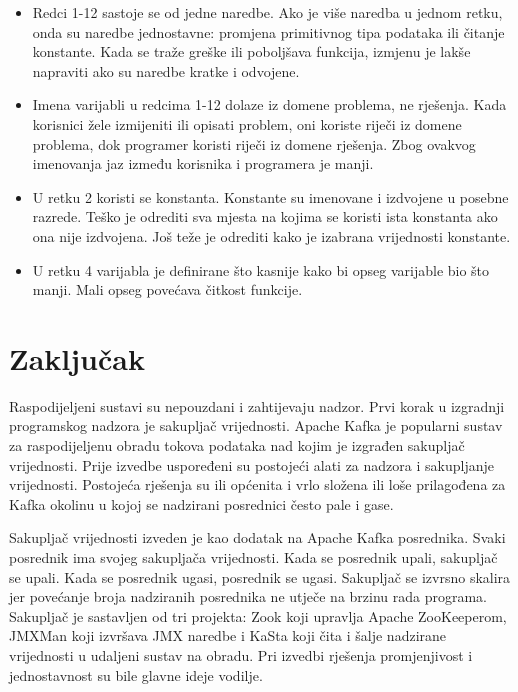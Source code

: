 \documentclass[utf8, diplomski, lmodern, numeric]{fer}
\begin{document}
\begin{itemize}
    \item Redci 1-12 sastoje se od jedne naredbe. Ako je više naredba u jednom retku, onda su naredbe jednostavne: promjena primitivnog tipa podataka ili čitanje konstante. Kada se traže greške ili poboljšava funkcija, izmjenu je lakše napraviti ako su naredbe kratke i odvojene.
    \item Imena varijabli u redcima 1-12 dolaze iz domene problema, ne rješenja. Kada korisnici žele izmijeniti ili opisati problem, oni koriste riječi iz domene problema, dok programer koristi riječi iz domene rješenja. Zbog ovakvog imenovanja jaz između korisnika i programera je manji.
    \item U retku 2 koristi se konstanta. Konstante su imenovane i izdvojene u posebne razrede. Teško je odrediti sva mjesta na kojima se koristi ista konstanta ako ona nije izdvojena. Još teže je odrediti kako je izabrana vrijednosti konstante.
    \item U retku 4 varijabla je definirane što kasnije kako bi opseg varijable bio što manji. Mali opseg povećava čitkost funkcije.
\end{itemize}



\chapter{Zaključak}

Raspodijeljeni sustavi su nepouzdani i zahtijevaju nadzor. Prvi korak u izgradnji programskog nadzora je sakupljač vrijednosti. Apache Kafka je popularni sustav za raspodijeljenu obradu tokova podataka nad kojim je izgrađen sakupljač vrijednosti. Prije izvedbe uspoređeni su postojeći alati za nadzora i sakupljanje vrijednosti. Postojeća rješenja su ili općenita i vrlo složena ili loše prilagođena za Kafka okolinu u kojoj se nadzirani posrednici često pale i gase.

Sakupljač vrijednosti izveden je kao dodatak na Apache Kafka posrednika. Svaki posrednik ima svojeg sakupljača vrijednosti. Kada se posrednik upali, sakupljač se upali. Kada se posrednik ugasi, posrednik se ugasi. Sakupljač se izvrsno skalira jer povećanje broja nadziranih posrednika ne utječe na brzinu rada programa. Sakupljač je sastavljen od tri projekta: Zook koji upravlja Apache ZooKeeperom, JMXMan koji izvršava JMX naredbe i KaSta koji čita i šalje nadzirane vrijednosti u udaljeni sustav na obradu. Pri izvedbi rješenja promjenjivost i jednostavnost su bile glavne ideje vodilje.
\end{document}
